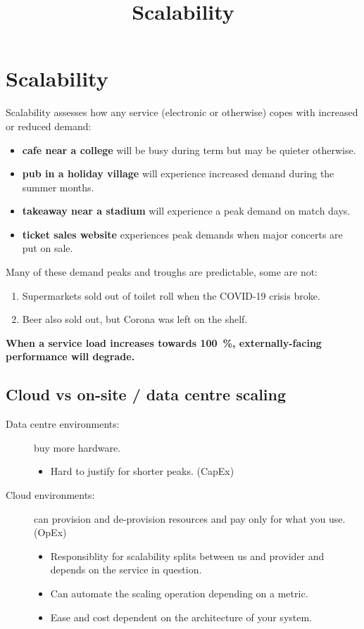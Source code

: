 \documentclass[slides]{pgnotes}
\title{Scalability}
\begin{document}
\maketitle

\tableofcontents

\section{Scalability}

Scalability assesses how any service (electronic or otherwise) copes with increased or reduced demand:
\begin{itemize}
\item \textbf{cafe near a college} will be busy during term but may be quieter otherwise.
\item \textbf{pub in a holiday village} will experience increased demand during the summer months.
\item \textbf{takeaway near a stadium} will experience a peak demand on match days.
\item \textbf{ticket sales website} experiences peak demands when major concerts are put on sale.
\end{itemize}
Many of these demand peaks and troughs are predictable, some are not:
\begin{enumerate}
\item Supermarkets sold out of toilet roll when the COVID-19 crisis broke.
\item Beer also sold out, but Corona was left on the shelf.
\end{enumerate}

\textbf{When a service load increases towards \SI{100}{\percent}, externally-facing performance will degrade.}

\subsection{Cloud vs on-site / data centre scaling}

\begin{description}
\item[Data centre environments:] buy more hardware.
  \begin{itemize}
  \item Hard to justify for shorter peaks. (CapEx)
  \end{itemize}
\item[Cloud environments:] can provision and de-provision resources and pay only for what you use. (OpEx)
  \begin{itemize}
  \item Responsiblity for scalability splits between us and provider and depends on the service in question.
  \item Can automate the scaling operation depending on a metric. 
  \item Ease and cost dependent on the architecture of your system. 
  \end{itemize}
\end{description}
\end{document}
